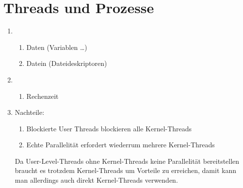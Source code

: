 \documentclass[DIN, pagenumber=false, fontsize=11pt, parskip=half]{scrartcl}
\begin{document}
    \section{Threads und Prozesse}
            \begin{enumerate}[label=(\alph*)]
                \item 
                    \begin{enumerate}
                        \item Daten (Variablen \ldots)
                        \item Datein (Dateideskriptoren)
                    \end{enumerate}
                \item
                    \begin{enumerate}
                        \item Rechenzeit
                    \end{enumerate}
                \item Nachteile:
                    \begin{enumerate}
                        \item Blockierte User Threads blockieren alle Kernel-Threads
                        \item Echte Parallelität erfordert wiederrum mehrere Kernel-Threads
                    \end{enumerate}
                    Da User-Level-Threads ohne Kernel-Threads keine Parallelität bereitstellen braucht es trotzdem Kernel-Threads um Vorteile zu erreichen, damit kann man allerdings auch direkt Kernel-Threads verwenden.
            \end{enumerate}
\end{document}
